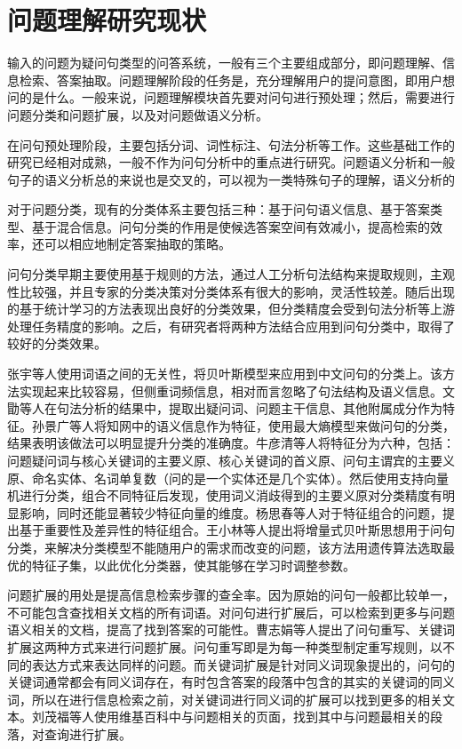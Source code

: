 \documentclass[master, winfont]{njuthesis}
\begin{document}
\section{问题理解研究现状}
输入的问题为疑问句类型的问答系统，一般有三个主要组成部分，即问题理解、信息检索、答案抽取。问题理解阶段的任务是，充分理解用户的提问意图，即用户想问的是什么。一般来说，问题理解模块首先要对问句进行预处理；然后，需要进行问题分类和问题扩展\cite{Cao2005QA}，以及对问题做语义分析。

在问句预处理阶段，主要包括分词、词性标注、句法分析等工作。这些基础工作的研究已经相对成熟，一般不作为问句分析中的重点进行研究。问题语义分析和一般句子的语义分析总的来说也是交叉的，可以视为一类特殊句子的理解，语义分析的

对于问题分类，现有的分类体系主要包括三种：基于问句语义信息、基于答案类型、基于混合信息\cite{ZhangNing2016}。问句分类的作用是使候选答案空间有效减小，提高检索的效率，还可以相应地制定答案抽取的策略。

问句分类早期主要使用基于规则的方法，通过人工分析句法结构来提取规则，主观性比较强，并且专家的分类决策对分类体系有很大的影响，灵活性较差。随后出现的基于统计学习的方法表现出良好的分类效果，但分类精度会受到句法分析等上游处理任务精度的影响。之后，有研究者将两种方法结合应用到问句分类中，取得了较好的分类效果。

张宇等人\cite{ZY2004}使用词语之间的无关性，将贝叶斯模型来应用到中文问句的分类上。该方法实现起来比较容易，但侧重词频信息，相对而言忽略了句法结构及语义信息。文勖等人\cite{Wen2006}在句法分析的结果中，提取出疑问词、问题主干信息、其他附属成分作为特征。孙景广等人\cite{Sun2007}将知网中的语义信息作为特征，使用最大熵模型来做问句的分类，结果表明该做法可以明显提升分类的准确度。牛彦清等人\cite{Niu2012}将特征分为六种，包括：问题疑问词与核心关键词的主要义原、核心关键词的首义原、问句主谓宾的主要义原、命名实体、名词单复数（问的是一个实体还是几个实体）。然后使用支持向量机进行分类，组合不同特征后发现，使用词义消歧得到的主要义原对分类精度有明显影响，同时还能显著较少特征向量的维度。杨思春等人\cite{YangSC2014}对于特征组合的问题，提出基于重要性及差异性的特征组合。王小林等人\cite{WangXL2014}提出将增量式贝叶斯思想用于问句分类，来解决分类模型不能随用户的需求而改变的问题，该方法用遗传算法选取最优的特征子集，以此优化分类器，使其能够在学习时调整参数。

问题扩展的用处是提高信息检索步骤的查全率。因为原始的问句一般都比较单一，不可能包含查找相关文档的所有词语。对问句进行扩展后，可以检索到更多与问题语义相关的文档，提高了找到答案的可能性。曹志娟等人\cite{Cao2005QA}提出了问句重写、关键词扩展这两种方式来进行问题扩展。问句重写即是为每一种类型制定重写规则，以不同的表达方式来表达同样的问题。而关键词扩展是针对同义词现象提出的，问句的关键词通常都会有同义词存在，有时包含答案的段落中包含的其实的关键词的同义词，所以在进行信息检索之前，对关键词进行同义词的扩展可以找到更多的相关文本。刘茂福等人\cite{Liu2012QA}使用维基百科中与问题相关的页面，找到其中与问题最相关的段落，对查询进行扩展。
\end{document}
